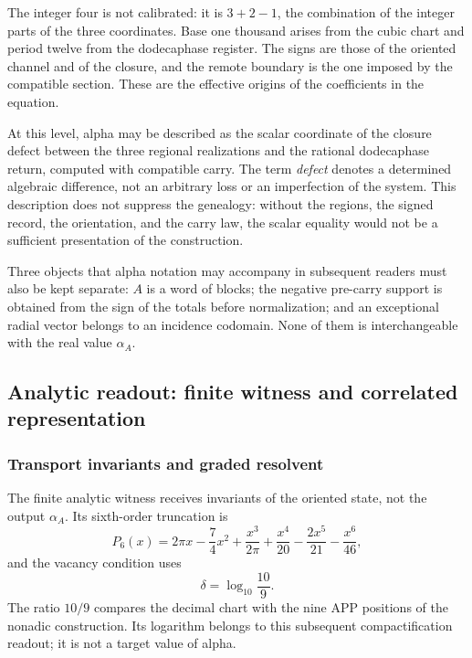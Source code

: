 The integer four is not calibrated: it is \(3+2-1\), the combination of the
integer parts of the three coordinates. Base one thousand arises from the
cubic chart and period twelve from the dodecaphase register. The signs are those
of the oriented channel and of the closure, and the remote boundary is the
one imposed by the compatible section. These are the effective origins of
the coefficients in the equation.

At this level, alpha may be described as the scalar coordinate of the closure
defect between the three regional realizations and the rational dodecaphase
return, computed with compatible carry. The term \emph{defect} denotes a
determined algebraic difference, not an arbitrary loss or an imperfection of
the system. This description does not suppress the genealogy: without the
regions, the signed record, the orientation, and the carry law, the scalar
equality would not be a sufficient presentation of the construction.

Three objects that alpha notation may accompany in subsequent readers must
also be kept separate: \(A\) is a word of blocks; the negative pre-carry
support is obtained from the sign of the totals before normalization; and an
exceptional radial vector belongs to an incidence codomain. None of them is
interchangeable with the real value \(\alpha_A\).






\subsection{Analytic readout: finite witness and correlated representation}
\subsubsection{Transport invariants and graded resolvent}
\label{subsec:alpha-via-b}

The finite analytic witness receives invariants of the oriented state, not the
output \(\alpha_A\). Its sixth-order truncation is
\begin{equation}
 P_6(x)=2\pi x-\frac74x^2
 +\frac{x^3}{2\pi}
 +\frac{x^4}{20}-\frac{2x^5}{21}-\frac{x^6}{46},
 \label{eq:alpha-p6}
\end{equation}
and the vacancy condition uses
\[
 \delta=\log_{10}\frac{10}{9}.
\]
The ratio \(10/9\) compares the decimal chart with the nine APP positions of
the nonadic construction. Its logarithm belongs to this subsequent
compactification readout; it is not a target value of alpha.

